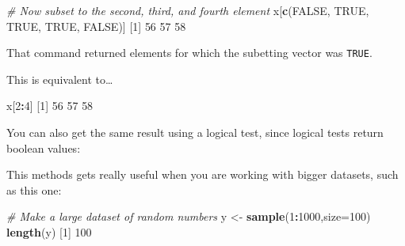 \documentclass[
]{book}
\newenvironment{Shaded}{\begin{snugshade}}{\end{snugshade}}
\newcommand{\CommentTok}[1]{\textcolor[rgb]{0.56,0.35,0.01}{\textit{#1}}}
\newcommand{\DataTypeTok}[1]{\textcolor[rgb]{0.13,0.29,0.53}{#1}}
\newcommand{\DecValTok}[1]{\textcolor[rgb]{0.00,0.00,0.81}{#1}}
\newcommand{\KeywordTok}[1]{\textcolor[rgb]{0.13,0.29,0.53}{\textbf{#1}}}
\newcommand{\NormalTok}[1]{#1}
\newcommand{\OperatorTok}[1]{\textcolor[rgb]{0.81,0.36,0.00}{\textbf{#1}}}
\newcommand{\OtherTok}[1]{\textcolor[rgb]{0.56,0.35,0.01}{#1}}
\newcommand{\StringTok}[1]{\textcolor[rgb]{0.31,0.60,0.02}{#1}}
\begin{document}
\begin{Shaded}
\begin{Highlighting}[]
\CommentTok{# Now subset to the second, third, and fourth element}
\NormalTok{x[}\KeywordTok{c}\NormalTok{(}\OtherTok{FALSE}\NormalTok{, }\OtherTok{TRUE}\NormalTok{, }\OtherTok{TRUE}\NormalTok{, }\OtherTok{TRUE}\NormalTok{, }\OtherTok{FALSE}\NormalTok{)]}
\NormalTok{[}\DecValTok{1}\NormalTok{] }\DecValTok{56} \DecValTok{57} \DecValTok{58}
\end{Highlighting}
\end{Shaded}

That command returned elements for which the subetting vector was \texttt{TRUE}.

This is equivalent to\ldots{}

\begin{Shaded}
\begin{Highlighting}[]
\NormalTok{x[}\DecValTok{2}\OperatorTok{:}\DecValTok{4}\NormalTok{]}
\NormalTok{[}\DecValTok{1}\NormalTok{] }\DecValTok{56} \DecValTok{57} \DecValTok{58}
\end{Highlighting}
\end{Shaded}

You can also get the same result using a logical test, since logical tests return boolean values:

\begin{Shaded}
\end{Shaded}

This methods gets really useful when you are working with bigger datasets, such as this one:

\begin{Shaded}
\begin{Highlighting}[]
\CommentTok{# Make a large dataset of random numbers}
\NormalTok{y <-}\StringTok{ }\KeywordTok{sample}\NormalTok{(}\DecValTok{1}\OperatorTok{:}\DecValTok{1000}\NormalTok{,}\DataTypeTok{size=}\DecValTok{100}\NormalTok{)}
\KeywordTok{length}\NormalTok{(y)}
\NormalTok{[}\DecValTok{1}\NormalTok{] }\DecValTok{100}
\end{Highlighting}
\end{Shaded}
\end{document}
